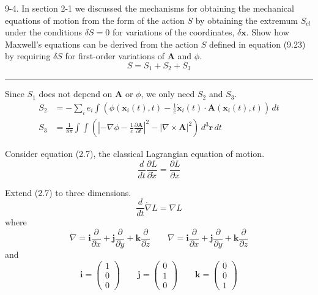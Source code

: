 \documentclass[12pt]{article}
\begin{document}
9-4.
In section 2-1 we discussed the mechanisms for obtaining
the mechanical equations of motion from the form of the action $S$ by
obtaining the extremum $S_{cl}$ under the conditions $\delta S=0$
for variations
of the coordinates, $\delta\mathbf x$. Show how Maxwell's equations can be
derived
from the action $S$ defined in equation (9.23) by requiring $\delta S$
for first-order variations of $\mathbf A$ and $\phi$.
\begin{equation*}
S=S_1+S_2+S_3
\tag{9.23}
\end{equation*}

\bigskip
\hrule

\bigskip
Since $S_1$ does not depend on $\mathbf A$ or $\phi$,
we only need $S_2$ and $S_3$.
\begin{align*}
S_2&=-\sum_i e_i\int\left(
\phi(\mathbf x_i(t),t)
-\frac{1}{c}\dot{\mathbf x}_i(t)\cdot\mathbf A(\mathbf x_i(t),t)
\right)
\,dt
\tag{9.25}
\\
S_3&=\frac{1}{8\pi}\int\int
\left(
\left|-\nabla\phi-\frac{1}{c}\frac{\partial\mathbf A}{\partial t}\right|^2
-\left|\nabla\times\mathbf A\right|^2
\right)
\,d^3\mathbf r\,dt
\tag{9.26}
\end{align*}

Consider equation (2.7), the classical Lagrangian equation of motion.
\begin{equation*}
\frac{d}{dt}\frac{\partial L}{\partial\dot x}=\frac{\partial L}{\partial x}
\tag{2.7}
\end{equation*}

Extend (2.7) to three dimensions.
\begin{equation*}
\frac{d}{dt}\dot\nabla L=\nabla L
\tag{1}
\end{equation*}
where
\begin{equation*}
\dot\nabla
=\mathbf i\frac{\partial}{\partial\dot x}
+\mathbf j\frac{\partial}{\partial\dot y}
+\mathbf k\frac{\partial}{\partial\dot z}
\qquad
\nabla
=\mathbf i\frac{\partial}{\partial x}
+\mathbf j\frac{\partial}{\partial y}
+\mathbf k\frac{\partial}{\partial z}
\end{equation*}
and
\begin{equation*}
\mathbf i=\begin{pmatrix}1\\0\\0\end{pmatrix}
\qquad
\mathbf j=\begin{pmatrix}0\\1\\0\end{pmatrix}
\qquad
\mathbf k=\begin{pmatrix}0\\0\\1\end{pmatrix}
\end{equation*}
\end{document}
